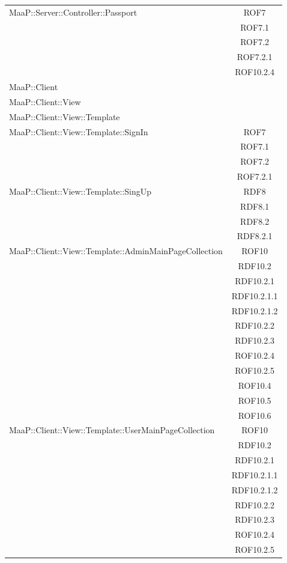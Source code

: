 \begin{center}
\begin{longtable}{|p{0.8\linewidth}|c|}
\midrule
MaaP::Server::Controller::Passport
& ROF7\\
& ROF7.1\\
& ROF7.2\\
& ROF7.2.1\\
& ROF10.2.4\\

\midrule
MaaP::Client
& \\

\midrule
MaaP::Client::View
& \\

\midrule
MaaP::Client::View::Template
& \\

\midrule
MaaP::Client::View::Template::SignIn
& ROF7\\
& ROF7.1\\
& ROF7.2\\
& ROF7.2.1\\

\midrule
MaaP::Client::View::Template::SingUp
& RDF8\\
& RDF8.1\\
& RDF8.2\\
& RDF8.2.1\\

\midrule
MaaP::Client::View::Template::AdminMainPageCollection
& ROF10\\
& RDF10.2\\
& RDF10.2.1\\
& RDF10.2.1.1\\
& RDF10.2.1.2\\
& RDF10.2.2\\
& RDF10.2.3\\
& ROF10.2.4\\
& ROF10.2.5\\
& ROF10.4\\
& ROF10.5\\
& ROF10.6\\


\midrule
MaaP::Client::View::Template::UserMainPageCollection
& ROF10\\
& RDF10.2\\
& RDF10.2.1\\
& RDF10.2.1.1\\
& RDF10.2.1.2\\
& RDF10.2.2\\
& RDF10.2.3\\
& ROF10.2.4\\
& ROF10.2.5\\


\end{longtable}
\end{center}
